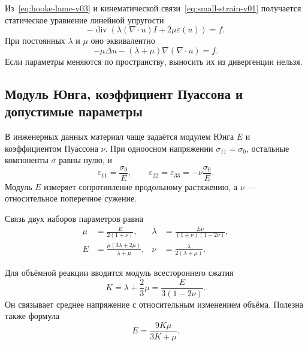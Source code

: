 Из~\eqref{eq:hooke-lame-v03} и кинематической связи~\eqref{eq:small-strain-v01} получается статическое уравнение линейной упругости
\begin{equation}
\label{eq:navier-lame-v03}
 -\operatorname{div}\!\left(
 \lambda(\nabla\cdot u)I+2\mu\varepsilon(u)
 \right)=f.
\end{equation}
При постоянных $\lambda$ и $\mu$ оно эквивалентно
\begin{equation}
\label{eq:navier-lame-constant-v03}
 -\mu\Delta u-(\lambda+\mu)\nabla(\nabla\cdot u)=f.
\end{equation}
Если параметры меняются по пространству, выносить их из дивергенции нельзя.

\subsection{Модуль Юнга, коэффициент Пуассона и допустимые параметры}

В инженерных данных материал чаще задаётся модулем Юнга $E$ и коэффициентом Пуассона $\nu$. При одноосном напряжении $\sigma_{11}=\sigma_0$, остальные компоненты $\sigma$ равны нулю, и
\begin{equation}
\label{eq:uniaxial-compliance-v03}
 \varepsilon_{11}=\frac{\sigma_0}{E},
 \qquad
 \varepsilon_{22}=\varepsilon_{33}
 =-\nu\frac{\sigma_0}{E}.
\end{equation}
Модуль $E$ измеряет сопротивление продольному растяжению, а $\nu$ --- относительное поперечное сужение.

Связь двух наборов параметров равна
\begin{align}
 \mu&=\frac{E}{2(1+\nu)},
 &
 \lambda&=\frac{E\nu}{(1+\nu)(1-2\nu)},
 \label{eq:young-poisson-to-lame-v03}\\
 E&=\frac{\mu(3\lambda+2\mu)}{\lambda+\mu},
 &
 \nu&=\frac{\lambda}{2(\lambda+\mu)}.
 \label{eq:lame-to-young-poisson-v03}
\end{align}

Для объёмной реакции вводится модуль всестороннего сжатия
\begin{equation}
\label{eq:bulk-modulus-v03}
 K=\lambda+\frac{2}{3}\mu
 =\frac{E}{3(1-2\nu)}.
\end{equation}
Он связывает среднее напряжение с относительным изменением объёма. Полезна также формула
\begin{equation}
\label{eq:young-from-bulk-shear-v03}
 E=\frac{9K\mu}{3K+\mu}.
\end{equation}

